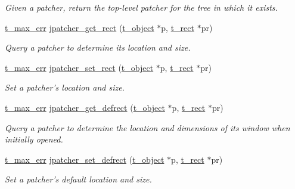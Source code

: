 \begin{DoxyCompactItemize}
\begin{DoxyCompactList}\small\item\em Given a patcher, return the top-\/level patcher for the tree in which it exists. \item\end{DoxyCompactList}\item 
\hyperlink{group__datatypes_ga73edaae82b318855cc09fac994918165}{t\_\-max\_\-err} \hyperlink{group__jpatcher_gaedf734a76297bf735810ac36e17748a1}{jpatcher\_\-get\_\-rect} (\hyperlink{structt__object}{t\_\-object} $\ast$p, \hyperlink{structt__rect}{t\_\-rect} $\ast$pr)
\begin{DoxyCompactList}\small\item\em Query a patcher to determine its location and size. \item\end{DoxyCompactList}\item 
\hyperlink{group__datatypes_ga73edaae82b318855cc09fac994918165}{t\_\-max\_\-err} \hyperlink{group__jpatcher_ga0a54c1b858851885088c5af970c9617d}{jpatcher\_\-set\_\-rect} (\hyperlink{structt__object}{t\_\-object} $\ast$p, \hyperlink{structt__rect}{t\_\-rect} $\ast$pr)
\begin{DoxyCompactList}\small\item\em Set a patcher's location and size. \item\end{DoxyCompactList}\item 
\hyperlink{group__datatypes_ga73edaae82b318855cc09fac994918165}{t\_\-max\_\-err} \hyperlink{group__jpatcher_ga177848d5433ff59335d06b15518f9df3}{jpatcher\_\-get\_\-defrect} (\hyperlink{structt__object}{t\_\-object} $\ast$p, \hyperlink{structt__rect}{t\_\-rect} $\ast$pr)
\begin{DoxyCompactList}\small\item\em Query a patcher to determine the location and dimensions of its window when initially opened. \item\end{DoxyCompactList}\item 
\hyperlink{group__datatypes_ga73edaae82b318855cc09fac994918165}{t\_\-max\_\-err} \hyperlink{group__jpatcher_gacc68e225735eac71aecfc69808bf0697}{jpatcher\_\-set\_\-defrect} (\hyperlink{structt__object}{t\_\-object} $\ast$p, \hyperlink{structt__rect}{t\_\-rect} $\ast$pr)
\begin{DoxyCompactList}\small\item\em Set a patcher's default location and size. \item\end{DoxyCompactList}\item 

\end{DoxyCompactItemize}
